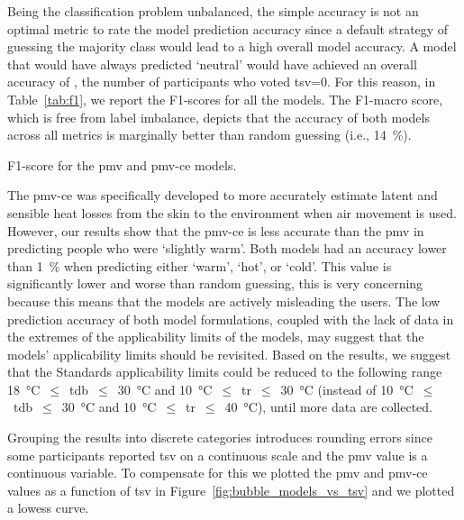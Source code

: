 Being the classification problem unbalanced, the simple accuracy is not an optimal metric to rate the model prediction accuracy since a default strategy of guessing the majority class would lead to a high overall model accuracy.
A model that would have always predicted `neutral' would have achieved an overall accuracy of , the number of participants who voted \ac{tsv}=0.
For this reason, in Table~\ref{tab:f1}, we report the F1-scores for all the models.
The F1-macro score, which is free from label imbalance, depicts that the accuracy of both models across all metrics is marginally better than random guessing (i.e., \qty{14}{\percent}).
\begin{table}[htb!]
    \centering
    
    \caption{F1-score for the \ac{pmv} and \ac{pmv-ce} models.}
    \label{tab:f1}
\end{table}

The \ac{pmv-ce} was specifically developed to more accurately estimate latent and sensible heat losses from the skin to the environment when air movement is used.
However, our results show that the \ac{pmv-ce} is less accurate than the \ac{pmv} in predicting people who were `slightly warm'.
Both models had an accuracy lower than \qty{1}{\percent} when predicting either `warm', `hot', or `cold'.
This value is significantly lower and worse than random guessing, this is very concerning because this means that the models are actively misleading the users.
The low prediction accuracy of both model formulations, coupled with the lack of data in the extremes of the applicability limits of the models, may suggest that the models' applicability limits should be revisited.
Based on the results, we suggest that the Standards applicability limits could be reduced to the following range \qty{18}{\celsius}~$\leq$~\ac{tdb}~$\leq$~\qty{30}{\celsius} and \qty{10}{\celsius}~$\leq$~\ac{tr}~$\leq$~\qty{30}{\celsius} (instead of \qty{10}{\celsius}~$\leq$~\ac{tdb}~$\leq$~\qty{30}{\celsius} and \qty{10}{\celsius}~$\leq$~\ac{tr}~$\leq$~\qty{40}{\celsius}),  until more data are collected. 

Grouping the results into discrete categories introduces rounding errors since some participants reported \ac{tsv} on a continuous scale and the \ac{pmv} value is a continuous variable.
To compensate for this we plotted the \ac{pmv} and \ac{pmv-ce} values as a function of \ac{tsv} in Figure~\ref{fig:bubble_models_vs_tsv} and we plotted a \ac{lowess} curve.

